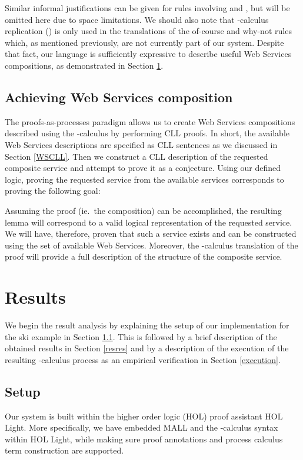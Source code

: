\documentclass[copyright,creativecommons]{eptcs}
\begin{document}
Similar informal justifications can be given for rules involving  and , but will be omitted here due to space limitations. We should also note that -calculus replication () is only used in the translations of the of-course and why-not rules which, as mentioned previously, are not currently part of our system. Despite that fact, our language is sufficiently expressive to describe useful Web Services compositions, as demonstrated in Section \ref{results}.

\subsection{Achieving Web Services composition}
\label{wscomp}

The proofs-as-processes paradigm allows us to create Web Services compositions described using the -calculus by performing CLL proofs. In short, the available Web Services descriptions are specified as CLL sentences as we discussed in Section \ref{WSCLL}. Then we construct a CLL description of the requested composite service and attempt to prove it as a conjecture. Using our defined logic, proving the requested service  from the available services  corresponds to proving the following goal:


Assuming the proof (ie.\ the composition) can be accomplished, the resulting lemma will correspond to a valid logical representation of the requested service. We will have, therefore, proven that such a service exists and can be constructed using the set of available Web Services. Moreover, the -calculus translation of the proof will provide a full description of the structure of the composite service.


\section{Results}
\label{results}

We begin the result analysis by explaining the setup of our implementation for the ski example in Section \ref{setup}. This is followed by a brief description of the obtained results in Section \ref{resres} and by a description of the execution of the resulting -calculus process as an empirical verification in Section \ref{execution}.

\subsection{Setup}
\label{setup}

Our system is built within the higher order logic (HOL) proof assistant HOL Light. More specifically, we have embedded MALL and the -calculus syntax within HOL Light, while making sure proof annotations and process calculus term construction are supported.
\end{document}
